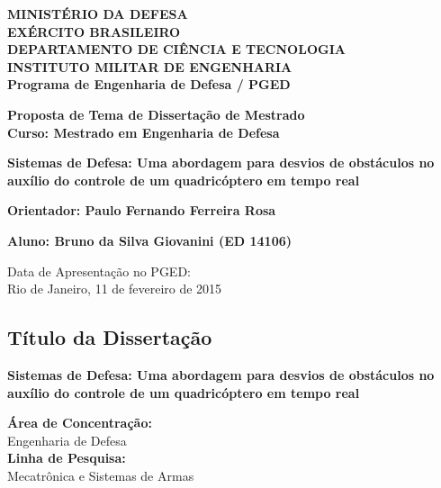 \documentclass[a4paper, 12pt]{article}
\author{Seu nome}
\title{}
\begin{document}
\begin{center}
\textbf{MINISTÉRIO DA DEFESA}\\
\textbf{EXÉRCITO BRASILEIRO}\\
\textbf{DEPARTAMENTO DE CIÊNCIA E TECNOLOGIA}\\
\textbf{INSTITUTO MILITAR DE ENGENHARIA}\\
\textbf{Programa de Engenharia de Defesa / PGED}

\vspace{2.5cm}

\begin{large}
\textbf{Proposta de Tema de Dissertação de Mestrado
\\Curso: Mestrado em Engenharia de Defesa}

\vspace{1.5cm}

\textbf{Sistemas de Defesa: Uma abordagem para desvios de obstáculos no auxílio do controle de um quadricóptero em tempo real}

\vspace{1.5cm}


\textbf{Orientador: Paulo Fernando Ferreira Rosa}

\end{large}

\vspace{1.5cm}

\textbf{Aluno: Bruno da Silva Giovanini (ED 14106)}


\vspace{2cm}

\begin{small}
Data de Apresentação no PGED:\\
Rio de Janeiro, 11 de fevereiro de 2015
\end{small}

\end{center}


\newpage
\begin{large}
\section*{Título da Dissertação}

\textbf{Sistemas de Defesa: Uma abordagem para desvios de obstáculos no auxílio do controle de um quadricóptero em tempo real}\\


\vspace{10cm}

\noindent\textbf{Área de Concentração:}\\
Engenharia de Defesa\\

\noindent\textbf{Linha de Pesquisa:}\\
Mecatrônica e Sistemas de Armas\\
\end{large}
\end{document}
